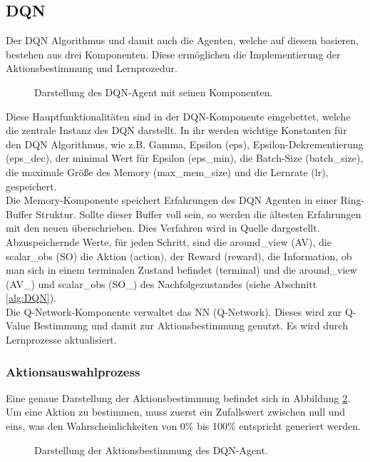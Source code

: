 \subsection{DQN} \label{sec:Konzept_DQN}
Der DQN Algorithmus und damit auch die Agenten, welche auf diesem basieren, bestehen aus drei Komponenten. Diese ermöglichen die Implementierung der Aktionsbestimmung und Lernprozedur.
\begin{figure}[H]
	\centering
	\def\svgscale{0.18}
	
	\caption[DQN-Agent]{Darstellung des DQN-Agent mit seinen Komponenten.}
	\label{fig:DQN-Agent}
\end{figure}
Diese Hauptfunktionalitäten sind in der DQN-Komponente eingebettet, welche die zentrale Instanz des DQN darstellt. In ihr werden wichtige Konstanten für den DQN Algorithmus, wie z.B. Gamma, Epsilon (eps), Epsilon-Dekrementierung (eps\_dec), der minimal Wert für Epsilon (eps\_min), die Batch-Size (batch\_size), die maximale Größe des Memory (max\_mem\_size) und die Lernrate (lr), gespeichert.\\
Die Memory-Komponente speichert Erfahrungen des DQN Agenten in einer Ring-Buffer Struktur. Sollte dieser Buffer voll sein, so werden die ältesten Erfahrungen mit den neuen überschrieben. Dies Verfahren wird in Quelle \cite[S. 5]{DBLP:journals/corr/MnihKSGAWR13} dargestellt.
Abzuspeichernde Werte, für jeden Schritt, sind die around\_view (AV), die scalar\_obs (SO) die Aktion (action), der Reward (reward), die Information, ob man sich in einem terminalen Zustand befindet (terminal) und die around\_view (AV\_) und scalar\_obs (SO\_) des Nachfolgezustandes (siehe Abschnitt \ref{alg:DQN}).\\
Die Q-Network-Komponente verwaltet das NN (Q-Network). Dieses wird zur Q-Value Bestimmung und damit zur Aktionsbestimmung genutzt. Es wird durch Lernprozesse aktualisiert.

\subsubsection{Aktionsauswahlprozess} \label{sec:Konzept_Aktionsauswahlprozess_DQN}
Eine genaue Darstellung der Aktionsbestimmung befindet sich in Abbildung \ref{fig:DQN-Aktionsbestimmung}. Um eine Aktion zu bestimmen, muss zuerst ein Zufallswert zwischen null und eins, was den Wahrscheinlichkeiten von 0\% bis 100\% entspricht generiert werden.
\begin{figure}[H]
	\centering
	\def\svgscale{0.13}
	
	\caption[DQN-Aktionsbestimmung]{Darstellung der Aktionsbestimmung des DQN-Agent.}
	\label{fig:DQN-Aktionsbestimmung}
\end{figure}


